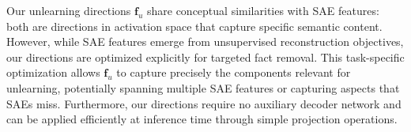 Our unlearning directions $\mathbf{f}_u$ share conceptual similarities with SAE features: both are directions in activation space that capture specific semantic content. However, while SAE features emerge from unsupervised reconstruction objectives, our directions are optimized explicitly for targeted fact removal. This task-specific optimization allows $\mathbf{f}_u$ to capture precisely the components relevant for unlearning, potentially spanning multiple SAE features or capturing aspects that SAEs miss. Furthermore, our directions require no auxiliary decoder network and can be applied efficiently at inference time through simple projection operations.
